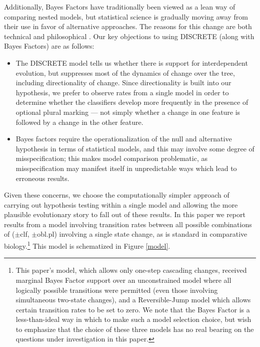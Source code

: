\documentclass[11pt]{article}
\begin{document}
Additionally, Bayes Factors have traditionally been viewed as a lean way of comparing nested models, but statistical science is gradually moving away from their use in favor of alternative approaches. 
The reasons for this change are both technical and philosophical \citep{GelmanShalizi2013}. 
Our key objections to using DISCRETE (along with Bayes Factors) are as follows:
\begin{itemize}
\item The DISCRETE model tells us whether there is support for interdependent evolution, but suppresses most of the dynamics of change over the tree, including directionality of change. Since directionality is built into our hypothesis, we prefer to observe rates from a single model in order to determine whether the classifiers develop more frequently in the presence of optional plural marking --- not simply whether a change in one feature is followed by a change in the other feature.
\item Bayes factors require the operationalization of the null and alternative hypothesis in terms of statistical models, and this may involve some degree of misspecification; this makes model comparison problematic, as misspecification may manifest itself in unpredictable ways which lead to erroneous results. 
\end{itemize}
Given these concerns, we choose the computationally simpler approach of carrying out hypothesis testing within a single model \citep[cf.][]{Kruschke2011} and allowing the more plausible evolutionary story to fall out of these results. 
In this paper we report results from a model involving transition rates between all possible combinations of {\sc ($\pm$clf, $\pm$obl.pl)} involving a single state change, as is standard in comparative biology.\footnote{This paper's model, which allows only one-step cascading changes, received marginal Bayes Factor support over an unconstrained model where all logically possible transitions were permitted (even those involving simultaneous two-state changes), and a Reversible-Jump model \citep{PagelMeade2006} which allows certain transition rates to be set to zero. We note that the Bayes Factor is a less-than-ideal way in which to make such a model selection choice, but wish to emphasize that the choice of these three models has no real bearing on the questions under investigation in this paper.} This model is schematized in Figure \ref{model}.
\end{document}
